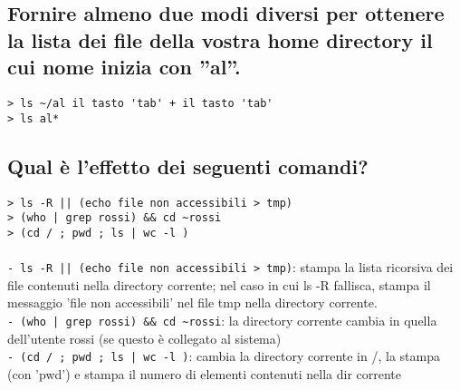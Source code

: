 \subsection{Fornire almeno due modi diversi per ottenere la lista dei file della
vostra home directory il cui nome inizia con ''al''.}
\verb:> ls ~/al il tasto 'tab' + il tasto 'tab': \\
\verb:> ls al*: \\


\subsection{Qual \`e l’effetto dei seguenti comandi?}
\verb:> ls -R || (echo file non accessibili > tmp): \\
\verb:> (who | grep rossi) && cd ~rossi: \\
\verb:> (cd / ; pwd ; ls | wc -l ):	\\
\\
\verb:- ls -R || (echo file non accessibili > tmp):: stampa la lista ricorsiva
dei file contenuti nella directory corrente; nel caso in cui ls -R
fallisca, stampa il messaggio 'file non accessibili' nel file tmp nella
directory corrente. \\
\verb:- (who | grep rossi) && cd ~rossi:: la directory corrente cambia in quella
dell'utente rossi (se questo è collegato al sistema)
\\
\verb:- (cd / ; pwd ; ls | wc -l ):: cambia la directory corrente in /, la
stampa (con 'pwd') e stampa il numero di elementi contenuti nella dir corrente \\
